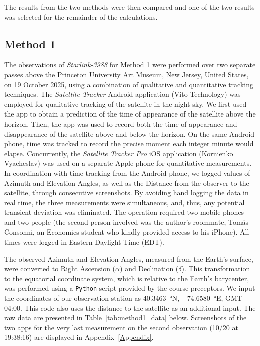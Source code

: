 \documentclass{article}
\begin{document}
The results from the two methods were then compared and one of the two results was selected for the remainder of the calculations.

\subsection{Method 1}

The observations of \textit{Starlink-3988} for Method 1 were performed over two separate passes above the Princeton University Art Museum, New Jersey, United States, on 19 October 2025, using a combination of qualitative and quantitative tracking techniques. The \textit{Satellite Tracker} Android application (Vito Technology) was employed for qualitative tracking of the satellite in the night sky. We first used the app to obtain a prediction of the time of appearance of the satellite above the horizon. Then, the app was used to record both the time of appearance and disappearance of the satellite above and below the horizon. On the same Android phone, time was tracked to record the precise moment each integer minute would elapse. Concurrently, the \textit{Satellite Tracker Pro} iOS application (Kornienko Vyacheslav) was used on a separate Apple phone for quantitative measurements. In coordination with time tracking from the Android phone, we logged values of Azimuth and Elevation Angles, as well as the Distance from the observer to the satellite, through consecutive screenshots. By avoiding hand logging the data in real time, the three measurements were simultaneous, and, thus, any potential transient deviation was eliminated. The operation required two mobile phones and two people (the second person involved was the author's roommate, Tomás Consonni, an Economics student who kindly provided access to his iPhone). All times were logged in Eastern Daylight Time (EDT).

The observed Azimuth and Elevation Angles, measured from the Earth's surface, were converted to Right Ascension ($\alpha$) and Declination ($\delta$). This transformation to the equatorial coordinate system, which is relative to the Earth's barycenter, was performed using a \texttt{Python} script provided by the course preceptors. We input the coordinates of our observation station as \SI{40.3463}{\degree}N, \SI{-74.6580}{\degree}E, GMT-04:00. This code also uses the distance to the satellite as an additional input. The raw data are presented in Table~\ref{tab:method1_data} below. Screenshots of the two apps for the very last measurement on the second observation (10/20 at 19:38:16) are displayed in Appendix~\ref{Appendix}.
\end{document}
